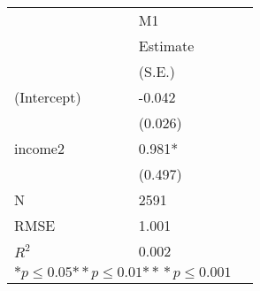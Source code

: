 \begin{tabular}{@{}l*{2}{l}@{}}
\hline
  &\multicolumn{1}{l}{M1  }\tabularnewline
 &\multicolumn{1}{l}{Estimate}\tabularnewline
 &\multicolumn{1}{l}{(S.E.)}\tabularnewline
 \hline
 \hline
  (Intercept) & -0.042 \tabularnewline
 &(0.026)\tabularnewline
  income2 & 0.981* \tabularnewline
 &(0.497)\tabularnewline
 \hline
 N&\multicolumn{1}{l}{2591} \tabularnewline
 RMSE&1.001\tabularnewline
 $R^2$&0.002\tabularnewline
 \hline
\hline
 
 \multicolumn{2}{l}{  ${*  p}\le 0.05$${*\!\!*  p}\le 0.01$${*\!\!*\!\!*  p}\le 0.001$}\tabularnewline
 \end{tabular}